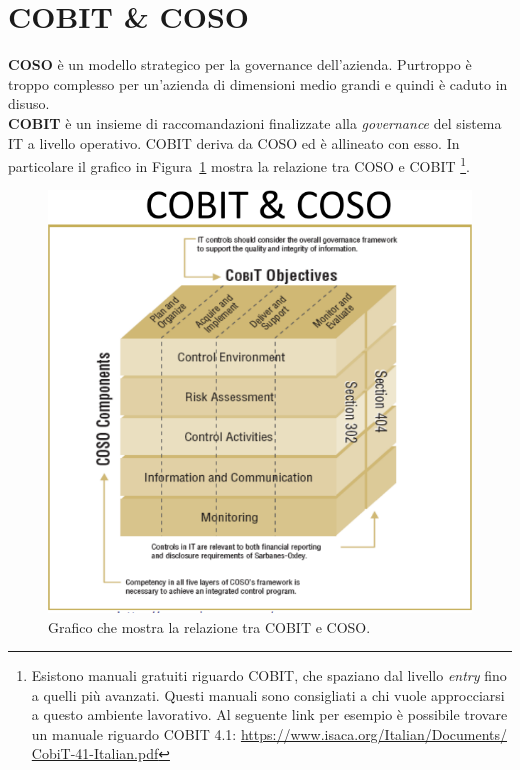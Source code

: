 \section{COBIT \& COSO}

\textbf{COSO} è un modello strategico per la governance dell'azienda. 
Purtroppo è troppo complesso per un'azienda di dimensioni medio grandi e 
quindi è caduto in disuso.\\
\newline
\textbf{COBIT} è un insieme di raccomandazioni finalizzate alla \textit{
governance} 
del sistema IT a livello operativo.
COBIT deriva da COSO ed è allineato con esso. In particolare il grafico in 
Figura~\ref{fig:cobit:coso:relazione} mostra la relazione tra COSO e COBIT
\footnote{Esistono manuali gratuiti 
riguardo COBIT, che spaziano dal livello \textit{entry} fino a quelli più 
avanzati. Questi manuali sono consigliati a chi vuole approcciarsi a questo 
ambiente lavorativo. Al seguente link per esempio è possibile trovare un 
manuale riguardo COBIT 4.1:  \url{https://www.isaca.org/Italian/Documents/
CobiT-41-Italian.pdf}}.

\begin{figure}[h!]
        \begin{center}
                \includegraphics[scale=2.0]{res/img/cobit_coso_cube}
        \end{center}
        \caption{Grafico che mostra la relazione tra COBIT e COSO.}
        \label{fig:cobit:coso:relazione}
\end{figure}

